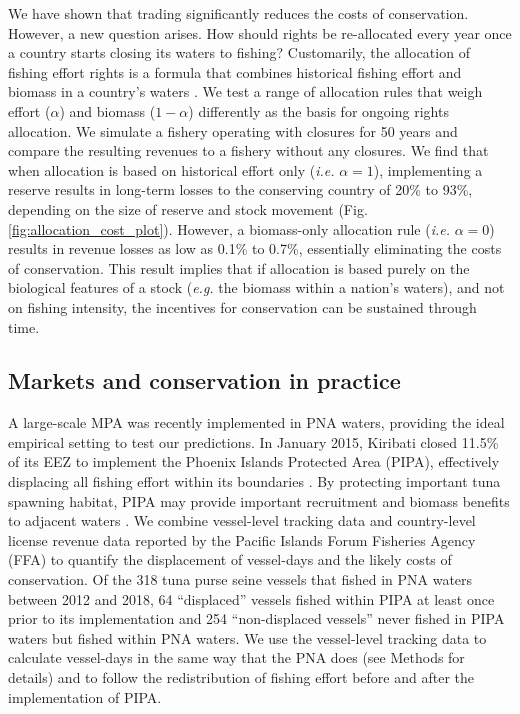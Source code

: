 \documentclass[12pt]{article}
\begin{document}
We have shown that trading significantly reduces the costs of conservation. However, a new question arises. How should rights be re-allocated every year once a country starts closing its waters to fishing? Customarily, the allocation of fishing effort rights is a formula that combines historical fishing effort and biomass in a country's waters \cite{havice_2013}. We test a range of allocation rules that weigh effort ($\alpha$) and biomass ($1 - \alpha$) differently as the basis for ongoing rights allocation. We simulate a fishery operating with closures for 50 years and compare the resulting revenues to a fishery without any closures. We find that when allocation is based on historical effort only (\emph{i.e.} $\alpha = 1$), implementing a reserve results in long-term losses to the conserving country of 20\% to 93\%, depending on the size of reserve and stock movement (Fig. \ref{fig:allocation_cost_plot}). However, a biomass-only allocation rule (\emph{i.e.} $\alpha = 0$) results in revenue losses as low as 0.1\% to 0.7\%, essentially eliminating the costs of conservation. This result implies that if allocation is based purely on the biological features of a stock (\emph{e.g.} the biomass within a nation's waters), and not on fishing intensity, the incentives for conservation can be sustained through time.

\subsection{Markets and conservation in practice}

A large-scale MPA was recently implemented in PNA waters, providing the ideal empirical setting to test our predictions. In January 2015, Kiribati closed 11.5\% of its EEZ to implement the Phoenix Islands Protected Area (PIPA), effectively displacing all fishing effort within its boundaries \cite{mccauley_2016,mcdermott_2018}. By protecting important tuna spawning habitat, PIPA may provide important recruitment and biomass benefits to adjacent waters \cite{hernndez_2019}. We combine vessel-level tracking data \cite{kroodsma_2018} and country-level license revenue data reported by the Pacific Islands Forum Fisheries Agency (FFA) \cite{ffa_2017} to quantify the displacement of vessel-days and the likely costs of conservation. Of the 318 tuna purse seine vessels that fished in PNA waters between 2012 and 2018, 64 ``displaced'' vessels fished within PIPA at least once prior to its implementation and 254 ``non-displaced vessels'' never fished in PIPA waters but fished within PNA waters. We use the vessel-level tracking data to calculate vessel-days in the same way that the PNA does (see Methods for details) and to follow the redistribution of fishing effort before and after the implementation of PIPA.
\end{document}
